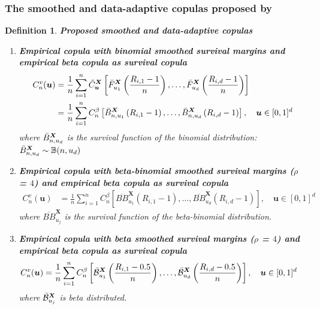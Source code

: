 \documentclass[12pt]{report}
\newtheorem{definition}{Definition}[subsection]
\newcommand{\1}{\mathbf{1}}
\begin{document}
\begin{flushleft}
\subsubsection{The smoothed and data-adaptive copulas proposed by \cite{Kojadinovic and Yi}}
\begin{definition}\label{ProposedSmoothCop}
\textit{\normalfont\parencite{KojadinovicYi2024Smooth}}\:
\textbf{Proposed smoothed and data-adaptive copulas} \\
\begin{enumerate}
\item \textbf{Empirical copula with binomial smoothed survival margins and empirical beta copula as survival copula}
\begin{align*}
C_{n}^{v}(\boldsymbol{u}) &= \frac{1}{n} \sum\limits_{i = 1}^{n} \Tilde{C}_{\boldsymbol{u}}^{\boldsymbol{X}} \left[\Bar{F}_{u_{1}}^{\boldsymbol{X}}\left(\frac{R_{i,1} - 1}{n}\right), \dots, \Bar{F}_{u_{d}}^{\boldsymbol{X}}\left(\frac{R_{i,d} - 1}{n}\right) \right] \\
&= \frac{1}{n} \sum\limits_{i = 1}^{n} C_{n}^{\beta} \left[\Bar{B}_{n, u_{1}}^{\boldsymbol{X}}\left(R_{i,1} - 1\right), \dots, \Bar{B}_{n, u_{d}}^{\boldsymbol{X}}\left(R_{i,d} - 1\right) \right], \quad \boldsymbol{u} \in [0,1]^{d}
\end{align*}
where $\Bar{B}_{n, u_{d}}^{\boldsymbol{X}}$ is the survival function of the binomial distribution: $\Bar{B}_{n, u_{d}}^{\boldsymbol{X}} \sim \mathbb{B}(n, u_{d})$
\item \textbf{Empirical copula with beta-binomial smoothed survival margins ($\rho$ = $4$) and empirical beta copula as survival copula}
\begin{align*}
C_{n}^{v}(\boldsymbol{u}) &= \frac{1}{n} \sum\limits_{i = 1}^{n} C_{n}^{\beta} \left[\overline{BB}_{u_{1}}^{\boldsymbol{X}}\left(R_{i,1} - 1\right), \dots, \overline{BB}_{u_{d}}^{\boldsymbol{X}}\left(R_{i,d} - 1\right) \right], \quad \boldsymbol{u} \in [0,1]^{d}
\end{align*}
where $\overline{BB}_{u_{j}}^{\boldsymbol{X}}$ is the survival function of the beta-binomial distribution.
\item \textbf{Empirical copula with beta smoothed survival margins ($\rho$ = $4$) and empirical beta copula as survival copula}
\begin{align*}
C_{n}^{v}(\boldsymbol{u}) &= \frac{1}{n} \sum\limits_{i = 1}^{n} C_{n}^{\beta} \left[\Bar{\mathcal{B}}_{u_{1}}^{\boldsymbol{X}}\left(\frac{R_{i,1} - 0.5}{n}\right), \dots, \Bar{\mathcal{B}}_{u_{d}}^{\boldsymbol{X}}\left(\frac{R_{i,d} - 0.5}{n}\right) \right], \quad \boldsymbol{u} \in [0,1]^{d}
\end{align*}
where $\Bar{\mathcal{B}}_{u_{j}}^{\boldsymbol{X}}$ is beta distributed.
\end{enumerate}
\end{definition}


\end{flushleft}
\end{document}
